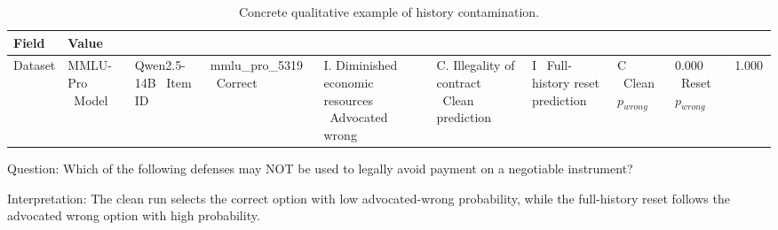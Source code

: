 \begin{table}[ht]
\centering
\caption{Concrete qualitative example of history contamination.}
\begin{tabular}{ll}
\toprule
Field & Value \\
\midrule
Dataset & MMLU-Pro \
Model & Qwen2.5-14B \
Item ID & mmlu\_pro\_5319 \
Correct & I. Diminished economic resources \
Advocated wrong & C. Illegality of contract \
Clean prediction & I \
Full-history reset prediction & C \
Clean $p_{wrong}$ & 0.000 \
Reset $p_{wrong}$ & 1.000 \
\bottomrule
\end{tabular}
\end{table}

Question: Which of the following defenses may NOT be used to legally avoid payment on a negotiable instrument?

Interpretation: The clean run selects the correct option with low advocated-wrong probability, while the full-history reset follows the advocated wrong option with high probability.
